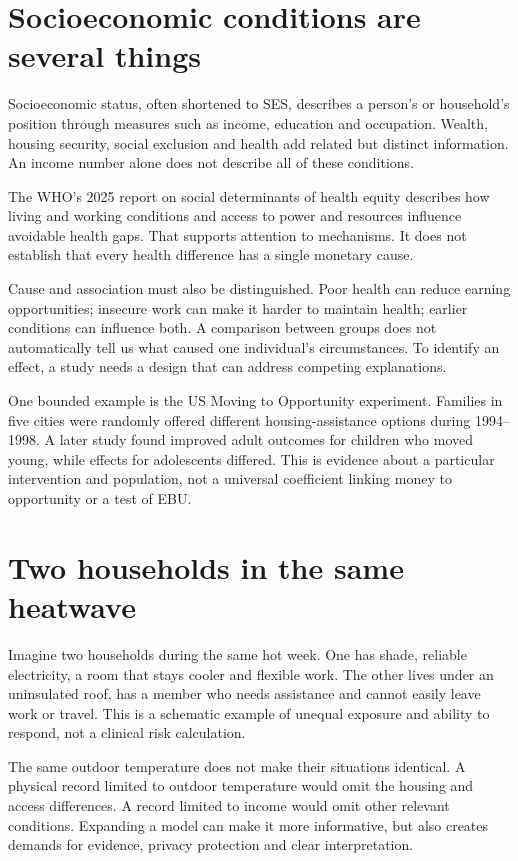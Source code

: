 \section{Socioeconomic conditions are several things}
Socioeconomic status, often shortened to SES, describes a person's or household's position through measures such as income, education and occupation. Wealth, housing security, social exclusion and health add related but distinct information. An income number alone does not describe all of these conditions.

The WHO's 2025 report on social determinants of health equity describes how living and working conditions and access to power and resources influence avoidable health gaps.\cite{health} That supports attention to mechanisms. It does not establish that every health difference has a single monetary cause.

Cause and association must also be distinguished. Poor health can reduce earning opportunities; insecure work can make it harder to maintain health; earlier conditions can influence both. A comparison between groups does not automatically tell us what caused one individual's circumstances. To identify an effect, a study needs a design that can address competing explanations.

One bounded example is the US Moving to Opportunity experiment. Families in five cities were randomly offered different housing-assistance options during 1994--1998. A later study found improved adult outcomes for children who moved young, while effects for adolescents differed. This is evidence about a particular intervention and population, not a universal coefficient linking money to opportunity or a test of EBU.\cite{mto}

\section{Two households in the same heatwave}
Imagine two households during the same hot week. One has shade, reliable electricity, a room that stays cooler and flexible work. The other lives under an uninsulated roof, has a member who needs assistance and cannot easily leave work or travel. This is a schematic example of unequal exposure and ability to respond, not a clinical risk calculation.

The same outdoor temperature does not make their situations identical. A physical record limited to outdoor temperature would omit the housing and access differences. A record limited to income would omit other relevant conditions. Expanding a model can make it more informative, but also creates demands for evidence, privacy protection and clear interpretation.

